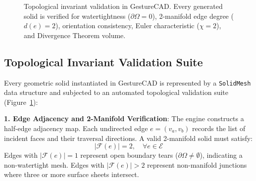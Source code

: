 \begin{figure}[t]
    \centering
    \caption{Topological invariant validation in GestureCAD. Every generated solid is verified for watertightness ($\partial \Omega = 0$), 2-manifold edge degree ($d(e) = 2$), orientation consistency, Euler characteristic ($\chi = 2$), and Divergence Theorem volume.}
    \label{fig:mesh_validation}
\end{figure}

\subsection{Topological Invariant Validation Suite}
Every geometric solid instantiated in GestureCAD is represented by a \texttt{SolidMesh} data structure and subjected to an automated topological validation suite (Figure~\ref{fig:mesh_validation}):

\textbf{1. Edge Adjacency and 2-Manifold Verification}: The engine constructs a half-edge adjacency map. Each undirected edge $e = (v_a, v_b)$ records the list of incident faces and their traversal directions. A valid 2-manifold solid must satisfy:
\begin{equation}
|\mathcal{F}(e)| = 2, \quad \forall e \in \mathcal{E}
\label{eq:manifold_edge}
\end{equation}
Edges with $|\mathcal{F}(e)| = 1$ represent open boundary tears ($\partial \Omega \neq \emptyset$), indicating a non-watertight mesh. Edges with $|\mathcal{F}(e)| > 2$ represent non-manifold junctions where three or more surface sheets intersect.

